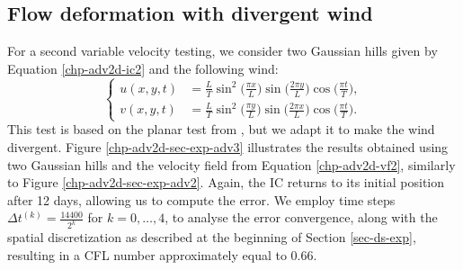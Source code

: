 \subsection{Flow deformation with divergent wind}
For a second variable velocity testing, we consider two Gaussian hills given by Equation 
\eqref{chp-adv2d-ic2} and the following wind:
\begin{equation}
	\label{chp-adv2d-vf2}
	\begin{cases}
		u(x,y,t) &= \frac{L}{T} \sin^2\big(\frac{\pi x}{L}\big) \sin\big(\frac{2\pi y}{L}\big) \cos\big(\frac{\pi t}{T}\big), \\
		v(x,y,t) &= \frac{L}{T} \sin^2\big(\frac{\pi y}{L}\big) \sin\big(\frac{2\pi x}{L}\big) \cos\big(\frac{\pi t}{T}\big).
	\end{cases}
\end{equation}
This test is based on the planar test from \citet{nair:2010}, but we adapt it to make the wind divergent.
Figure \ref{chp-adv2d-sec-exp-adv3} illustrates the results obtained using two Gaussian hills and the velocity field 
from Equation \eqref{chp-adv2d-vf2}, similarly to Figure  \ref{chp-adv2d-sec-exp-adv2}.
Again, the IC returns to its initial position after 12 days, allowing us to compute the error.
We employ time steps $\Delta t^{(k)}=\frac{14400}{2^{k}}$ for 
$k = 0, \ldots, 4$, to analyse the error convergence, 
along with the spatial discretization as described at the beginning of Section \ref{sec-ds-exp},
resulting in a CFL number approximately equal to 0.66.
